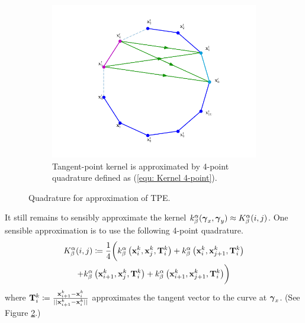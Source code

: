 \documentclass[../dissertation.tex]{subfiles}
\begin{document}
\begin{figure}[tbp]
\begin{subfigure}[b]{0.75\textwidth}
        \includegraphics[width=\textwidth]{sections/unknottingCurveImgs/energyDiscretization2}
        \caption{Tangent-point kernel is approximated by 4-point quadrature defined as (\ref{equ: Kernel 4-point}).}
        \label{fig: Tangent-point kernel approximation}
    \end{subfigure}
    \caption{Quadrature for approximation of TPE.}
\end{figure}

It still remains to sensibly approximate the kernel $k_{\beta}^{\alpha} (\boldsymbol{\gamma}_x, \boldsymbol{\gamma}_y) \approx K_{\beta}^{\alpha} (i, j)$.
One sensible approximation is to use the following 4-point quadrature\cite{YSC2021}.
\begin{multline}
    K_{\beta}^{\alpha} (i, j) \coloneqq \frac{1}{4} \biggl( k_{\beta}^{\alpha} \left( \mathbf{x}_i^k, \mathbf{x}_j^k, \mathbf{T}_i^k \right)
        + k_{\beta}^{\alpha} \left( \mathbf{x}_i^k, \mathbf{x}_{j+1}^k, \mathbf{T}_i^k \right) \\
        + k_{\beta}^{\alpha} \left( \mathbf{x}_{i+1}^k, \mathbf{x}_j^k, \mathbf{T}_i^k \right)
        + k_{\beta}^{\alpha} \left( \mathbf{x}_{i+1}^k, \mathbf{x}_{j+1}^k, \mathbf{T}_i^k \right)
    \biggr)
    \label{equ: Kernel 4-point}
\end{multline}
where $\mathbf{T}_{i}^k \coloneqq \frac{\mathbf{x}_{i+1}^k - \mathbf{x}_i^k}{\lvert \lvert \mathbf{x}_{i+1}^k - \mathbf{x}_i^k \rvert \rvert}$ approximates the tangent vector to the curve at $\boldsymbol{\gamma}_x$.
(See Figure \ref{fig: Tangent-point kernel approximation}.)
\end{document}
